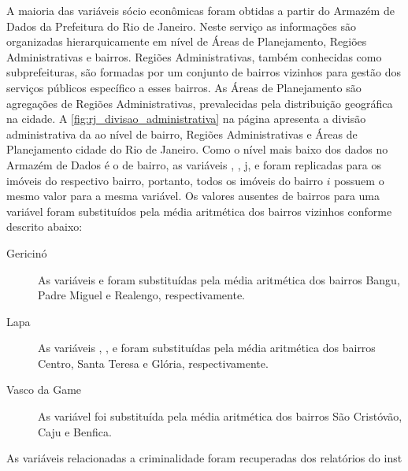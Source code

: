 A maioria das variáveis sócio econômicas foram obtidas a partir do Armazém de Dados da Prefeitura do Rio de Janeiro. Neste serviço as informações são organizadas hierarquicamente em nível de Áreas de Planejamento, Regiões Administrativas e  bairros. Regiões Administrativas, também conhecidas como subprefeituras, são formadas por um conjunto de bairros vizinhos para gestão dos serviços públicos específico a esses bairros. As Áreas de Planejamento são agregações de Regiões Administrativas, prevalecidas pela distribuição geográfica na cidade. A \cref{fig:rj_divisao_administrativa} na página 	\pageref{fig:rj_divisao_administrativa} apresenta a divisão administrativa da ao nível de bairro, Regiões Administrativas e Áreas de Planejamento cidade do Rio de Janeiro. Como o nível mais baixo dos dados no Armazém de Dados é o de bairro, as variáveis , , j, e  foram replicadas para os imóveis do respectivo bairro, portanto, todos os imóveis do bairro $ i $ possuem o mesmo valor para a mesma variável. Os valores ausentes de bairros para uma variável foram substituídos pela média aritmética dos bairros vizinhos conforme descrito abaixo:

\begin{description}
	\item[Gericinó] As variáveis  e   foram substituídas pela média aritmética dos bairros Bangu, Padre Miguel e Realengo, respectivamente.

	\item[Lapa] 	As variáveis , ,  e   foram substituídas pela média aritmética dos bairros Centro, Santa Teresa e Glória, respectivamente.
	
	\item[Vasco da Game] 	As variável  foi  substituída pela média aritmética dos bairros São Cristóvão, Caju e Benfica.
		

\end{description}

As variáveis relacionadas a criminalidade \var{} foram recuperadas dos relatórios do inst